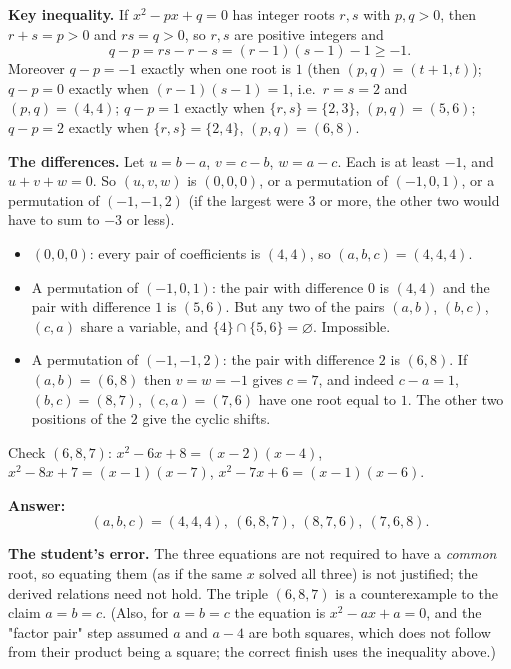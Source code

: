 \textbf{Key inequality.} If $x^2-px+q=0$ has integer roots $r,s$ with $p,q>0$, then $r+s=p>0$ and $rs=q>0$, so $r,s$ are positive integers and
\[
q-p=rs-r-s=(r-1)(s-1)-1\ge-1 .
\]
Moreover $q-p=-1$ exactly when one root is $1$ (then $(p,q)=(t+1,t)$); $q-p=0$ exactly when $(r-1)(s-1)=1$, i.e.\ $r=s=2$ and $(p,q)=(4,4)$; $q-p=1$ exactly when $\{r,s\}=\{2,3\}$, $(p,q)=(5,6)$; $q-p=2$ exactly when $\{r,s\}=\{2,4\}$, $(p,q)=(6,8)$.

\textbf{The differences.} Let $u=b-a$, $v=c-b$, $w=a-c$. Each is at least $-1$, and $u+v+w=0$. So $(u,v,w)$ is $(0,0,0)$, or a permutation of $(-1,0,1)$, or a permutation of $(-1,-1,2)$ (if the largest were $3$ or more, the other two would have to sum to $-3$ or less).
\begin{itemize}
\item $(0,0,0)$: every pair of coefficients is $(4,4)$, so $(a,b,c)=(4,4,4)$.
\item A permutation of $(-1,0,1)$: the pair with difference $0$ is $(4,4)$ and the pair with difference $1$ is $(5,6)$. But any two of the pairs $(a,b)$, $(b,c)$, $(c,a)$ share a variable, and $\{4\}\cap\{5,6\}=\varnothing$. Impossible.
\item A permutation of $(-1,-1,2)$: the pair with difference $2$ is $(6,8)$. If $(a,b)=(6,8)$ then $v=w=-1$ gives $c=7$, and indeed $c-a=1$, $(b,c)=(8,7)$, $(c,a)=(7,6)$ have one root equal to $1$. The other two positions of the $2$ give the cyclic shifts.
\end{itemize}
Check $(6,8,7)$: $x^2-6x+8=(x-2)(x-4)$, $x^2-8x+7=(x-1)(x-7)$, $x^2-7x+6=(x-1)(x-6)$.

\textbf{Answer:}
\[
\boxed{(a,b,c)=(4,4,4),\ (6,8,7),\ (8,7,6),\ (7,6,8)} .
\]

\textbf{The student's error.} The three equations are not required to have a \emph{common} root, so equating them (as if the same $x$ solved all three) is not justified; the derived relations need not hold. The triple $(6,8,7)$ is a counterexample to the claim $a=b=c$. (Also, for $a=b=c$ the equation is $x^2-ax+a=0$, and the "factor pair" step assumed $a$ and $a-4$ are both squares, which does not follow from their product being a square; the correct finish uses the inequality above.)
